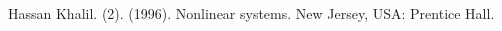 \begin{thebibliography}{99}
 Hassan Khalil. (2). (1996). Nonlinear systems. New Jersey, USA: Prentice Hall. %
\end{thebibliography}